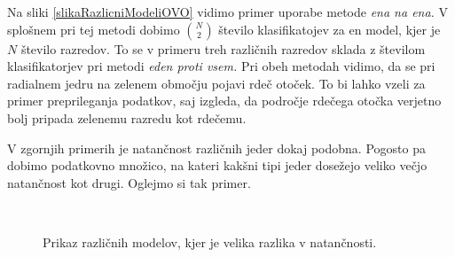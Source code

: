 \documentclass[mat1]{fmfdelo}
\begin{document}
Na sliki \ref{slikaRazlicniModeliOVO} vidimo primer uporabe metode \emph{ena na ena.} V splošnem pri tej metodi dobimo $\binom{N}{2}$ število klasifikatojev za en model, kjer je $N$ število razredov. To se v primeru treh različnih razredov sklada z številom klasifikatorjev pri metodi \emph{eden proti vsem.} 
Pri obeh metodah vidimo, da se pri radialnem jedru na zelenem območju pojavi rdeč otoček. To bi lahko vzeli za primer preprileganja podatkov, saj izgleda, da področje rdečega otočka verjetno bolj pripada zelenemu razredu kot rdečemu.  

V zgornjih primerih je natančnost različnih jeder dokaj podobna. Pogosto pa dobimo podatkovno množico, na kateri kakšni tipi jeder dosežejo veliko večjo natančnost kot drugi. Oglejmo si tak primer. 


\begin{figure}[ht]
	\centering
	\hfill %
	\hfill %
	\\
	\caption{Prikaz različnih modelov, kjer je velika razlika v natančnosti.}
	\label{slikaRazlikaVNatancnosti}
\end{figure}
\end{document}
